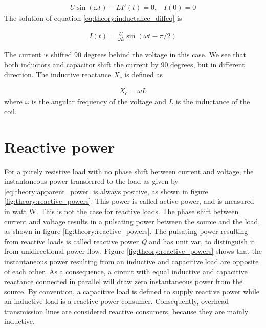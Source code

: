 \documentclass[class=book, crop=false]{standalone}
\begin{document}
\begin{equation}
   \begin{aligned}\label{eq:theory:inductance_diffeq}
U\sin{(\omega t)} - LI'(t) = 0, \;\;\; I(0) = 0
\end{aligned} 
\end{equation}
The solution of equation \eqref{eq:theory:inductance_diffeq} is

\begin{equation}
   \begin{aligned}\label{eq:theory:inductancee_diffeq_solved}
I(t) = \frac{U}{\omega L}  \sin(\omega t - \pi/2)
\end{aligned} 
\end{equation}


The current is shifted 90 degrees behind the voltage in this case. We see that both inductors and capacitor shift the current by 90 degrees, but in different direction. The inductive reactance $X_{c}$ is defined as

\begin{equation}
   \begin{aligned}\label{eq:theory:reactance_inductive}
X_{c} = \omega L
\end{aligned} 
\end{equation}
where $\omega$ is the angular frequency of the voltage and $L$ is the inductance of the coil. 

\section{Reactive power}
For a purely resistive load with no phase shift between current and voltage, the instantaneous power transferred to the load as given by \eqref{eq:theory:apparent_power} is always positive, as shown in figure \ref{fig:theory:reactive_powers}. This power is called active power, and is measured in watt W. This is not the case for reactive loads. The phase shift between current and voltage results in a pulsating power between the source and the load, as shown in figure \ref{fig:theory:reactive_powers}. The pulsating power resulting from reactive loads is called reactive power \textit{Q} and has unit var, to distinguish it from unidirectional power flow. Figure \ref{fig:theory:reactive_powers} shows that the instantaneous power resulting from an inductive and capacitive load are opposite of each other. As a consequence, a circuit with equal inductive and capacitive reactance connected in parallel will draw zero instantaneous power from the source. By convention, a capacitive load is defined to supply reactive power while an inductive load is a reactive power consumer. Consequently, overhead transmission lines are considered reactive consumers, because they are mainly inductive. 
\end{document}
